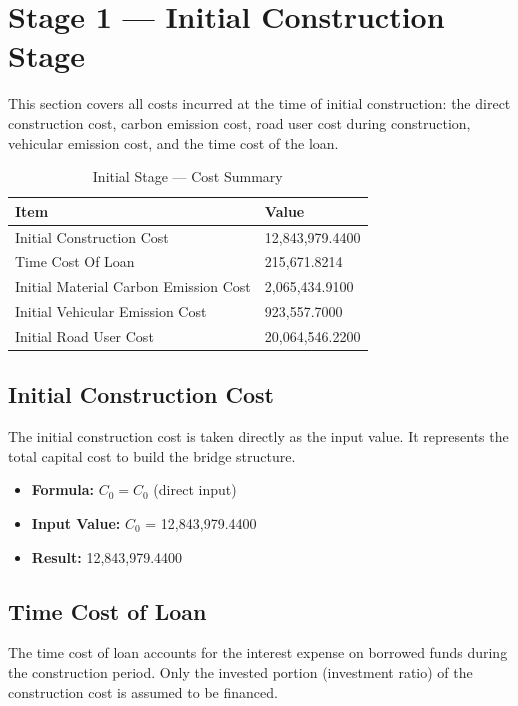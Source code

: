 \documentclass[12pt,a4paper]{article}
\begin{document}
\section{Stage 1 --- Initial Construction Stage}

This section covers all costs incurred at the time of initial construction: the direct construction cost, carbon emission cost, road user cost during construction, vehicular emission cost, and the time cost of the loan.


\begin{table}[H]
\centering
\caption{Initial Stage --- Cost Summary}
\begin{tabular}{L{9cm}R{5cm}}
\toprule
\textbf{Item} & \textbf{Value} \\
\midrule
  Initial Construction Cost & 12,843,979.4400 \\
  Time Cost Of Loan & 215,671.8214 \\
  Initial Material Carbon Emission Cost & 2,065,434.9100 \\
  Initial Vehicular Emission Cost & 923,557.7000 \\
  Initial Road User Cost & 20,064,546.2200 \\
\bottomrule
\end{tabular}
\end{table}


\subsection{Initial Construction Cost}

The initial construction cost is taken directly as the input value. It represents the total capital cost to build the bridge structure.


\begin{itemize}
  \item \textbf{Formula:} $C_0 = C_0$ (direct input)
  \item \textbf{Input Value:} $C_0$ = 12,843,979.4400
  \item \textbf{Result:} 12,843,979.4400
\end{itemize}

\subsection{Time Cost of Loan}

The time cost of loan accounts for the interest expense on borrowed funds during the construction period. Only the invested portion (investment ratio) of the construction cost is assumed to be financed.
\end{document}
